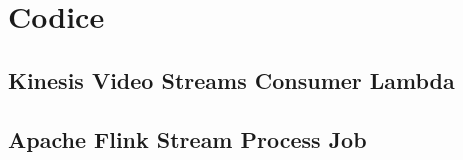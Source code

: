 \chapter{Codice}
\label{appendix:Appendice A}

\section{Kinesis Video Streams Consumer Lambda}




\newpage
\section{Apache Flink Stream Process Job}

